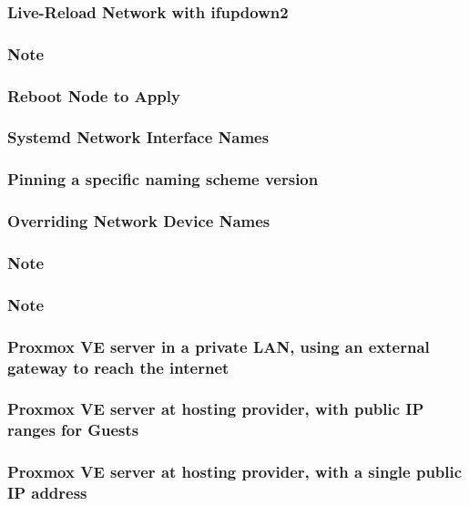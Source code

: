 \subsubsection{Live-Reload Network with ifupdown2}

\subsubsection{Note}

\subsubsection{Reboot Node to Apply}

\subsubsection{Systemd Network Interface Names}

\subsubsection{Pinning a specific naming scheme version}

\subsubsection{Overriding Network Device Names}

\subsubsection{Note}

\subsubsection{Note}

\subsubsection{Proxmox VE server in a private LAN, using an external gateway to reach the internet}

\subsubsection{Proxmox VE server at hosting provider, with public IP ranges for Guests}

\subsubsection{Proxmox VE server at hosting provider, with a single public IP address}


